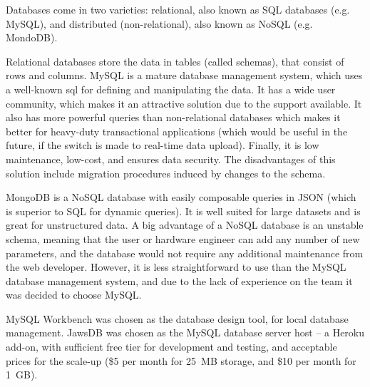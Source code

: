 Databases come in two varieties: relational, also known as SQL databases (e.g. MySQL), and distributed (non-relational), also known as NoSQL (e.g. MondoDB).


Relational databases store the data in tables (called schemas), that consist of rows and columns. MySQL is a mature database management system, which uses a well-known \gls{sql} for defining and manipulating the data. It has a wide user community, which makes it an attractive solution due to the support available. It also has more powerful queries than non-relational databases which makes it better for heavy-duty transactional applications (which would be useful in the future, if the switch is made to real-time data upload). Finally, it is low maintenance, low-cost, and ensures data security. The disadvantages of this solution include migration procedures induced by changes to the schema.
    

MongoDB is a NoSQL database with easily composable queries in JSON (which is superior to SQL for dynamic queries). It is well suited for large datasets and is great for unstructured data. A big advantage of a NoSQL database is an unstable schema, meaning that the user or hardware engineer can add any number of new parameters, and the database would not require any additional maintenance from the web developer. However, it is less straightforward to use than the MySQL database management system, and due to the lack of experience on the team it was decided to choose MySQL. 

MySQL Workbench was chosen as the database design tool, for local database management. JawsDB was chosen as the MySQL database server host -- a Heroku add-on, with sufficient free tier for development and testing, and acceptable prices for the scale-up (\$5 per month for \SI{25}{MB} storage, and \$10 per month for \SI{1}{GB}).

